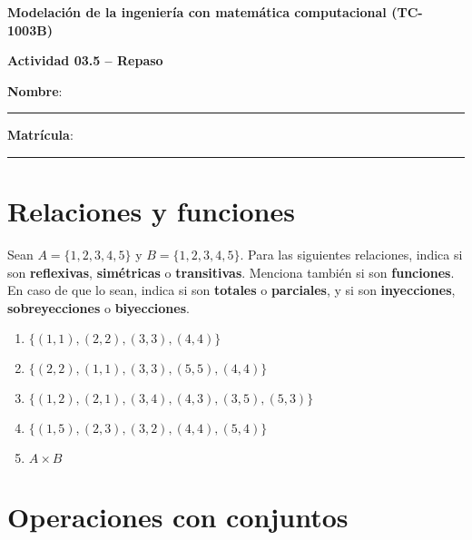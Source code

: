 \documentclass[spanish, 10pt]{article}
\begin{document}
\begin{center}
	{\Large \textbf{Modelación de la ingeniería con matemática computacional (TC-1003B)}}
	
	\bigskip
	{\large \textbf{Actividad 03.5 -- Repaso}}
\end{center}

\bigskip
{\large \textbf{Nombre}: \rule{13.7 cm}{0.4mm}}



\bigskip
{\large \textbf{Matrícula}: \rule{5 cm}{0.4mm}} %

\bigskip


\section{Relaciones y funciones}

Sean $A = \{1,2,3,4,5\}$ y $B = \{1,2,3,4,5\}$.
Para las siguientes relaciones, indica si son \textbf{reflexivas}, \textbf{simétricas} o \textbf{transitivas}.
Menciona también si son \textbf{funciones}. En caso de que lo sean, indica si son \textbf{totales} o \textbf{parciales}, y si son \textbf{inyecciones}, \textbf{sobreyecciones} o \textbf{biyecciones}.

\begin{enumerate}[label=\tt \alph*)]
    \itemsep0em
    \item $\{(1,1), (2,2), (3,3), (4,4)\}$
    \item $\{(2,2), (1,1), (3,3), (5,5), (4,4)\}$
    \item $\{(1,2), (2,1), (3,4), (4,3), (3,5), (5,3)\}$
    \item $\{(1,5), (2,3), (3,2), (4,4), (5, 4)\}$
    \item $A \times B$
\end{enumerate}

\vspace{7ex}

\section{Operaciones con conjuntos}
\end{document}
